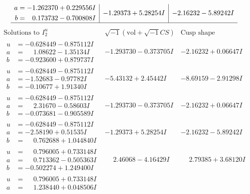 \documentclass[1p]{elsarticle_modified}
\theoremstyle{definition}
\newcommand{\I}{\sqrt{-1}}
\begin{document}
$$\begin{array}{c|c|c}
\begin{aligned}
a &= -1.262370 + 0.229556 I \\
b &= \phantom{-}0.173732 - 0.700808 I\end{aligned}
 & -1.29373 + 5.28254 I & -2.16232 - 5.89242 I\\
 \hline 
 \end{array}$$\newpage$$\begin{array}{c|c|c}  
\text{Solutions to }I^u_{2}& \I (\text{vol} + \sqrt{-1}CS) & \text{Cusp shape}\\
 \hline 
\begin{aligned}
u &= -0.628449 - 0.875112 I \\
a &= \phantom{-}1.08622 - 1.35134 I \\
b &= -0.923600 + 0.879737 I\end{aligned}
 & -1.293730 - 0.373705 I & -2.16232 + 0.06647 I \\ \hline\begin{aligned}
u &= -0.628449 - 0.875112 I \\
a &= -1.52683 - 0.97782 I \\
b &= -0.10677 + 1.91340 I\end{aligned}
 & -5.43132 + 2.45442 I & -8.69159 - 2.91298 I \\ \hline\begin{aligned}
u &= -0.628449 - 0.875112 I \\
a &= \phantom{-}2.31670 - 0.58603 I \\
b &= -0.073681 - 0.905589 I\end{aligned}
 & -1.293730 - 0.373705 I & -2.16232 + 0.06647 I \\ \hline\begin{aligned}
u &= -0.628449 - 0.875112 I \\
a &= -2.58190 + 0.51535 I \\
b &= \phantom{-}0.762688 + 1.044840 I\end{aligned}
 & -1.29373 + 5.28254 I & -2.16232 - 5.89242 I \\ \hline\begin{aligned}
u &= \phantom{-}0.796005 + 0.733148 I \\
a &= \phantom{-}0.713362 - 0.505363 I \\
b &= -0.502274 + 1.249400 I\end{aligned}
 & \phantom{-}2.46068 - 4.16429 I & \phantom{-}2.79385 + 3.68120 I \\ \hline\begin{aligned}
u &= \phantom{-}0.796005 + 0.733148 I \\
a &= \phantom{-}1.238440 + 0.048506 I \\

\end{aligned}
\end{array}$$
\end{document}
